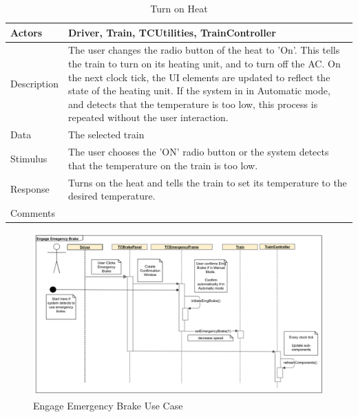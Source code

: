 \documentclass[]{article}
\begin{document}
\begin{table}[H]
	\centering
	\caption{Turn on Heat}
	\begin{tabular}{|l|l|}
		\hline
		Actors & \parbox[t]{10cm}{Driver, Train, TCUtilities, TrainController} \\ \hline
		Description & \parbox[t]{10cm}{The user changes the radio button of the heat to 'On'. This tells the train to turn on its heating unit, and to turn off the AC.  On the next clock tick, the UI elements are updated to reflect the state of the heating unit. If the system in in Automatic mode, and detects that the temperature is too low, this process is repeated without the user interaction.} \\ \hline
		Data &  \parbox[t]{10cm}{The selected train} \\ \hline
		Stimulus &  \parbox[t]{10cm}{ The user chooses the 'ON' radio button or the system detects that the temperature on the train is too low. } \\ \hline
		Response & \parbox[t]{10cm}{Turns on the heat and tells the train to set its temperature to the desired temperature.}\\ \hline
		Comments & \parbox[t]{10cm}{}  \\ \hline
	\end{tabular}
\end{table}

\begin{figure}[H]
	\centering
	\includegraphics[scale=.3]{tc_emgBrake_usecase}
	\caption{Engage Emergency Brake Use Case}
\end{figure}
\end{document}
